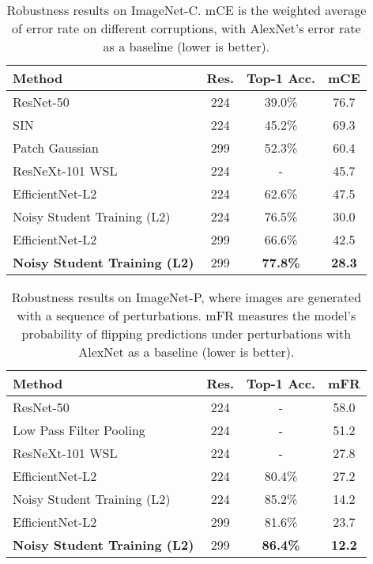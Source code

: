 \documentclass[10pt,twocolumn,letterpaper]{article}
\begin{document}
\begin{table}[h!]
\small
    \centering 
        \begin{tabular}{l|c|cc}         
        \toprule 
        Method & Res. & Top-1 Acc. & mCE \\
        \midrule
        ResNet-50 \cite{hendrycks2018benchmarking} & 224 & 39.0\% & 76.7 \\
        SIN \cite{geirhos2018imagenet} &224 & 45.2\% & 69.3 \\
        Patch Gaussian \cite{lopes2019improving}  & 299 & 52.3\% & 60.4 \\
        ResNeXt-101 WSL~\cite{mahajan2018exploring,orhan2019robustness} & 224 & - & 45.7 \\
        \midrule
	    EfficientNet-L2  & 224 &  62.6\% &  47.5 \\
		Noisy Student Training (L2) & 224  &  76.5\% &  30.0 \\
		
	    EfficientNet-L2  & 299 & 66.6\% & 42.5  \\
		\bf Noisy Student Training (L2) & 299 & \bf 77.8\% & \bf 28.3 \\ 
        \bottomrule
        \end{tabular}
    \caption{Robustness results on ImageNet-C. mCE is the weighted average of error rate on different corruptions, with AlexNet's error rate as a baseline (lower is better).
    }  
    \label{tab:robustness2}
\end{table}


\begin{table}[h!]
\small
    \centering
        \begin{tabular}{l|c|cc}         
        \toprule 
        Method & Res. & Top-1 Acc. & mFR \\
        \midrule
        ResNet-50 \cite{hendrycks2018benchmarking} & 224 & - & 58.0 \\
        Low Pass Filter Pooling \cite{zhang2019making} &224 & - & 51.2 \\
        
        ResNeXt-101 WSL~\cite{mahajan2018exploring,orhan2019robustness} & 224 & - & 27.8  \\
        \midrule
	    EfficientNet-L2  & 224 & 80.4\% & 27.2  \\
		Noisy Student Training (L2) & 224 & 85.2\% & 14.2  \\ 
	    EfficientNet-L2  & 299 & 81.6\% &  23.7 \\
		\bf Noisy Student Training (L2) & 299 & \bf 86.4\% & \bf 12.2 \\
        \bottomrule
        \end{tabular}
    \caption{Robustness results on ImageNet-P, where images are generated with a sequence of perturbations. mFR measures the model's probability of flipping predictions under perturbations with AlexNet as a baseline (lower is better).
    }  
    \label{tab:robustness3}
\end{table}
\end{document}
